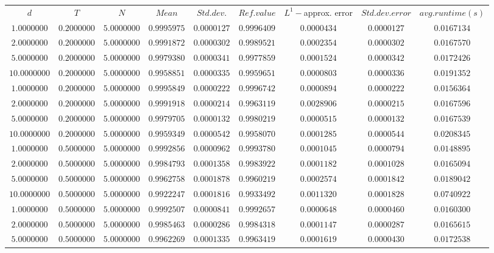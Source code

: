 \begin{tabular}{ccccccccc}
$d$ & $T$ & $N$ & $Mean$ & $Std. dev.$ & $Ref. value$ & $L^1-$approx. error & $Std. dev. error$ & $avg. runtime (s)$\\
$1.0000000$ & $0.2000000$ & $5.0000000$ & $0.9995975$ & $0.0000127$ & $0.9996409$ & $0.0000434$ & $0.0000127$ & $0.0167134$\\
$2.0000000$ & $0.2000000$ & $5.0000000$ & $0.9991872$ & $0.0000302$ & $0.9989521$ & $0.0002354$ & $0.0000302$ & $0.0167570$\\
$5.0000000$ & $0.2000000$ & $5.0000000$ & $0.9979380$ & $0.0000341$ & $0.9977859$ & $0.0001524$ & $0.0000342$ & $0.0172426$\\
$10.0000000$ & $0.2000000$ & $5.0000000$ & $0.9958851$ & $0.0000335$ & $0.9959651$ & $0.0000803$ & $0.0000336$ & $0.0191352$\\
$1.0000000$ & $0.2000000$ & $5.0000000$ & $0.9995849$ & $0.0000222$ & $0.9996742$ & $0.0000894$ & $0.0000222$ & $0.0156364$\\
$2.0000000$ & $0.2000000$ & $5.0000000$ & $0.9991918$ & $0.0000214$ & $0.9963119$ & $0.0028906$ & $0.0000215$ & $0.0167596$\\
$5.0000000$ & $0.2000000$ & $5.0000000$ & $0.9979705$ & $0.0000132$ & $0.9980219$ & $0.0000515$ & $0.0000132$ & $0.0167539$\\
$10.0000000$ & $0.2000000$ & $5.0000000$ & $0.9959349$ & $0.0000542$ & $0.9958070$ & $0.0001285$ & $0.0000544$ & $0.0208345$\\
$1.0000000$ & $0.5000000$ & $5.0000000$ & $0.9992856$ & $0.0000962$ & $0.9993780$ & $0.0001045$ & $0.0000794$ & $0.0148895$\\
$2.0000000$ & $0.5000000$ & $5.0000000$ & $0.9984793$ & $0.0001358$ & $0.9983922$ & $0.0001182$ & $0.0001028$ & $0.0165094$\\
$5.0000000$ & $0.5000000$ & $5.0000000$ & $0.9962758$ & $0.0001878$ & $0.9960219$ & $0.0002574$ & $0.0001842$ & $0.0189042$\\
$10.0000000$ & $0.5000000$ & $5.0000000$ & $0.9922247$ & $0.0001816$ & $0.9933492$ & $0.0011320$ & $0.0001828$ & $0.0740922$\\
$1.0000000$ & $0.5000000$ & $5.0000000$ & $0.9992507$ & $0.0000841$ & $0.9992657$ & $0.0000648$ & $0.0000460$ & $0.0160300$\\
$2.0000000$ & $0.5000000$ & $5.0000000$ & $0.9985463$ & $0.0000286$ & $0.9984318$ & $0.0001147$ & $0.0000287$ & $0.0165615$\\
$5.0000000$ & $0.5000000$ & $5.0000000$ & $0.9962269$ & $0.0001335$ & $0.9963419$ & $0.0001619$ & $0.0000430$ & $0.0172538$\\

\end{tabular}
